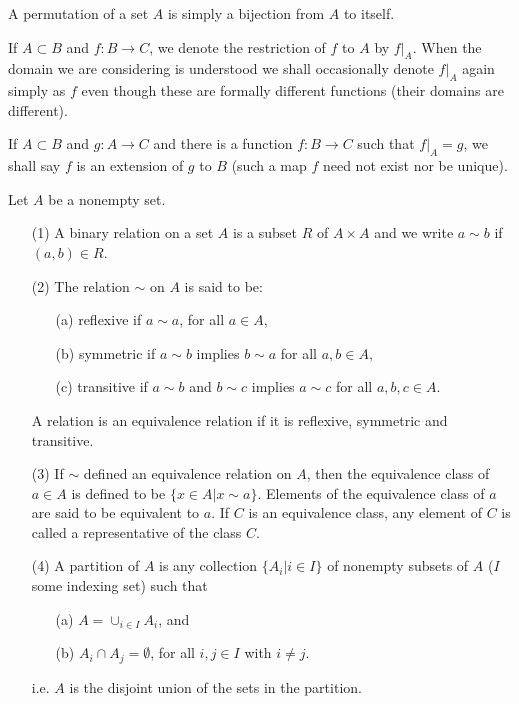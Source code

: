 \documentclass[cn,11pt,chinese]{elegantbook}
\numberwithin{equation}{section}
\begin{document}
A permutation of a set $A$ is simply a bijection from $A$ to itself.

If $A \subset B$ and $f: B \to C$, we denote the restriction of $f$ to $A$ by $f|_A$. When the domain we are  considering is understood we shall occasionally denote $f|_A$ again simply as $f$ even though these are formally different functions (their domains are different).

If $A \subset B$ and $g: A \to C$ and there is a function $f: B \to C$ such that $f|_A = g$, we shall say $f$ is an extension of $g$ to $B$ (such a map $f$ need not exist nor be unique).

Let $A$ be a nonempty set.
\begin{enumerate}
\item[(1)] A binary relation on a set $A$ is a subset $R$ of $A \times A$ and we write $a \sim b$ if $(a, b)\in R$.
\item[(2)] The relation $\sim$ on $A$ is said to be: 
\begin{enumerate}
\item[(a)] reflexive if $a \sim a$, for all $a \in A$,
\item[(b)] symmetric if $a \sim b$ implies $b \sim a$ for all $a, b \in A$,
\item[(c)] transitive if $a \sim b$ and $b \sim c$ implies $a \sim c$ for all $a,b,c \in A$.
\end{enumerate}
A relation is an equivalence relation if it is reflexive, symmetric and transitive.

\item[(3)] If $\sim$ defined an equivalence relation on $A$, then the equivalence class of $a \in A$ is defined to be $\{x \in A| x \sim a\}$. Elements of the equivalence class of $a$ are said to be equivalent to $a$. If $C$ is an equivalence class, any element of $C$ is called a representative of the class $C$.

\item[(4)] A partition of $A$ is any collection $\{A_i|i\in I\}$ of nonempty subsets of $A$ ($I$ some indexing set) such that
\begin{enumerate}
\item[(a)] $A = \cup_{i \in I}{A_i}$, and
\item[(b)] $A_i \cap A_j = \emptyset$, for all $i, j \in I$ with $i \neq j$.
\end{enumerate}
i.e. $A$ is the disjoint union of the sets in the partition.
\end{enumerate}
\end{document}
